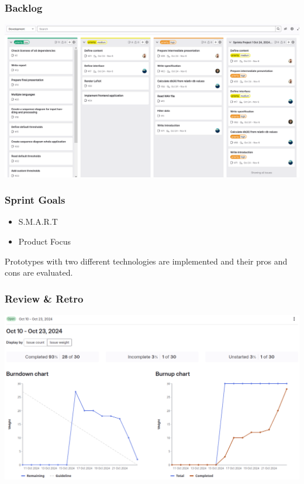 \begin{frame}
    \frametitle{Backlog}
    \centering
    \includegraphics[width=0.85\linewidth]{../assets/backlog_interim_presentation.png}
\end{frame}

\begin{frame}
    \frametitle{Sprint Goals}
    \begin{itemize}
        \large
        \item S.M.A.R.T
        \item Product Focus
    \end{itemize}
    \par\vspace{0.5cm}
    \begin{example}
        Prototypes with two different technologies are implemented and their pros and cons are evaluated.
    \end{example}
\end{frame}

\begin{frame}
    \frametitle{Review \& Retro}
    \centering
    \includegraphics[width=0.84\linewidth]{../assets/burndown_sprint_001.png}
\end{frame}

